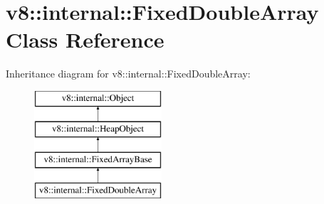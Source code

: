 \hypertarget{classv8_1_1internal_1_1_fixed_double_array}{}\section{v8\+:\+:internal\+:\+:Fixed\+Double\+Array Class Reference}
\label{classv8_1_1internal_1_1_fixed_double_array}
Inheritance diagram for v8\+:\+:internal\+:\+:Fixed\+Double\+Array\+:\begin{figure}[H]
\begin{center}
\leavevmode
\includegraphics[height=4.000000cm]{classv8_1_1internal_1_1_fixed_double_array}
\end{center}
\end{figure}
